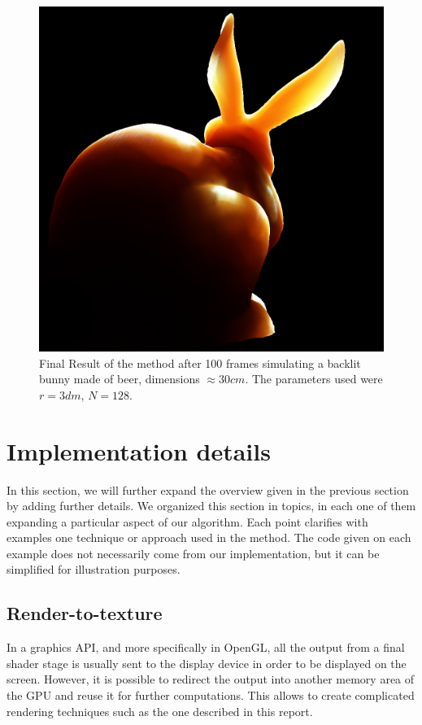 \begin{figure}[!ht]
\centering
\includegraphics[width=0.8 \linewidth]{images/results/beer_backlit_100_convergence.png}
\caption{Final Result of the method after 100 frames simulating a backlit bunny made of beer, dimensions $\approx 30 cm$. The parameters used were $r = 3 dm$, $N = 128$.}
\label{fig:beer_result}
\end{figure} 

\section{Implementation details}
In this section, we will further expand the overview given in the previous section by adding further details. We organized this section in topics, in each one of them expanding a particular aspect of our algorithm. Each point clarifies with examples one technique or approach used in the method. The code given on each example does not necessarily come from our implementation, but it can be simplified for illustration purposes.

\subsection{Render-to-texture}
\label{sec:rendertotexture}
In a graphics API, and more specifically in OpenGL, all the output from a final shader stage is usually sent to the display device in order to be displayed on the screen. However, it is possible to redirect the output into another memory area of the GPU and reuse it for further computations. This allows to create complicated rendering techniques such as the one described in this report. 

